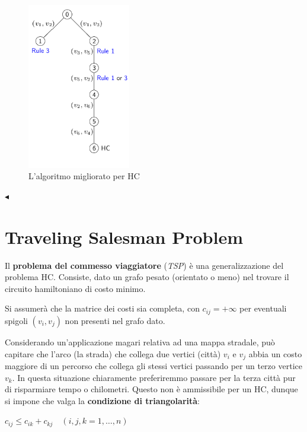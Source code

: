 \documentclass[11pt]{book}
\begin{document}
\begin{figure}[H]
  \centering
  \includegraphics[width=0.4\textwidth]{images/cap7hamilton3.png}
  \caption{L'algoritmo migliorato per HC}
  \label{cap7hamilton3}
\end{figure}

$\blacktriangleleft$
\vspace{11pt}

\section{Traveling Salesman Problem}

Il {\bf problema del commesso viaggiatore} ({\em TSP}) \`e una
generalizzazione del problema HC. Consiste, dato un grafo pesato
(orientato o meno) nel trovare il circuito hamiltoniano di costo
minimo.

Si assumer\`a che la matrice dei costi sia completa, con $c_{ij} = +
\infty$ per eventuali spigoli $(v_i,v_j)$ non presenti nel grafo dato.

Considerando un'applicazione magari relativa ad una mappa stradale,
pu\`o capitare che l'arco (la strada) che collega due vertici
(citt\`a) $v_i$ e $v_j$ abbia un costo maggiore di un percorso che
collega gli stessi vertici passando per un terzo vertice $v_k$. In
questa situazione chiaramente preferiremmo passare per la terza
citt\`a pur di risparmiare tempo o chilometri. Questo non \`e
ammissibile per un HC, dunque si impone che valga la {\bf condizione
  di triangolarit\`a}:

\begin{center}
$c_{ij} \leq c_{ik} + c_{kj} \quad (i,j,k=1,\dots,n)$  
\end{center}
\end{document}
